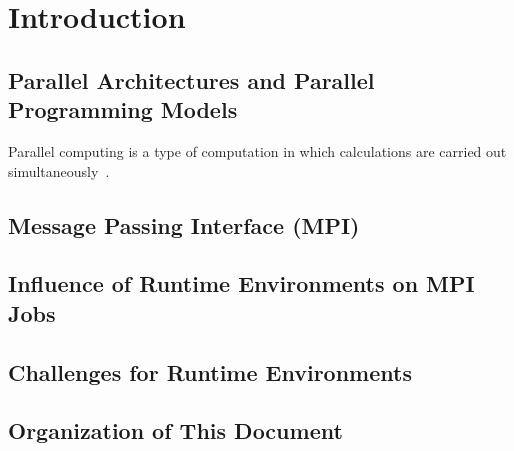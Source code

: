 \chapter{Introduction}
\label{sec:Introduction}

\section{Parallel Architectures and Parallel Programming Models}
\label{sec:Introduction}

Parallel computing is a type of computation in which calculations are carried out simultaneously~\cite{Almasi:1989:HPC:160438}.

\section{Message Passing Interface (MPI)}
\label{sec:Introduction}


\section{Influence of Runtime Environments on MPI Jobs}
\label{sec:Introduction}


\section{Challenges for Runtime Environments}
\label{sec:Introduction}


\section{Organization of This Document}
\label{sec:Introduction}

